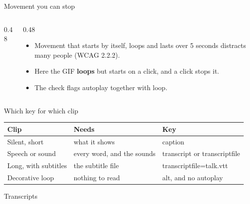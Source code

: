 \documentclass[aspectratio=169]{beamer}
\newcommand{\code}[1]{{\small\ttfamily #1}}
\begin{document}
\begin{frame}{Movement you can stop}
  \begin{columns}[c]
    \begin{column}{0.48\textwidth}
      \centering
    \end{column}
    \begin{column}{0.48\textwidth}
      \begin{itemize}
        \item Movement that starts by itself, loops and lasts over 5 seconds distracts many people (WCAG 2.2.2).
        \item Here the GIF \textbf{loops} but starts on a click, and a click stops it.
        \item The check flags \code{autoplay} together with \code{loop}.
      \end{itemize}
    \end{column}
  \end{columns}
\end{frame}

\begin{frame}{Which key for which clip}
  \centering
  \begin{tabular}{@{}lll@{}}
    \toprule
    \textbf{Clip} & \textbf{Needs} & \textbf{Key} \\
    \midrule
    Silent, short & what it shows & \code{caption} \\
    Speech or sound & every word, and the sounds & \code{transcript} or \code{transcriptfile} \\
    Long, with subtitles & the subtitle file & \code{transcriptfile=talk.vtt} \\
    Decorative loop & nothing to read & \code{alt}, and no \code{autoplay} \\
    \bottomrule
  \end{tabular}
\end{frame}

\begin{frame}[allowframebreaks]{Transcripts}
  \AccTranscripts
\end{frame}
\end{document}
